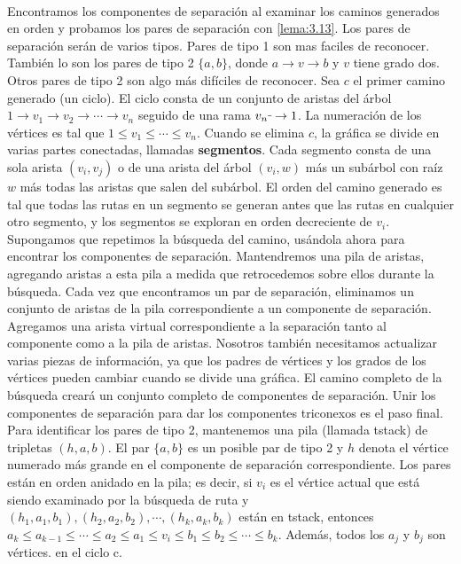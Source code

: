 \paragraph{}
Encontramos los componentes de separación al examinar los caminos generados en orden y probamos los pares de separación con \ref{lema:3.13}. Los pares de separación serán de varios tipos. Pares de tipo 1 son mas faciles de reconocer. También lo son los pares de tipo 2 $\{a, b\}$, donde $a \rightarrow v \rightarrow b$ y $v$ tiene grado dos. Otros pares de tipo 2 son algo más difíciles de reconocer. Sea $c$ el primer camino generado (un ciclo). El ciclo consta de un conjunto de aristas del árbol $1 \rightarrow v_{1} \rightarrow v_{2} \rightarrow \cdots \rightarrow v_{n}$ seguido de una rama $v_{n} \rule[1mm]{.1cm}{0.4pt} \rightarrow 1$. La numeración de los vértices es tal que $1 \le v_{1} \le \cdots \le v_{n}$. Cuando se elimina $c$, la gráfica se divide en varias partes conectadas, llamadas \textbf{segmentos}. Cada segmento consta de una sola arista $\left(v_{i}, v_{j}\right)$ o de una arista del árbol $\left(v_{i}, w\right)$ más un subárbol con raíz $w$ más todas las aristas que salen del subárbol. El orden del camino generado es tal que todas las rutas en un segmento se generan antes que las rutas en cualquier otro segmento, y los segmentos se exploran en orden decreciente de $v_{i}$.\\
Supongamos que repetimos la búsqueda del camino, usándola ahora para encontrar los componentes de separación. Mantendremos una pila de aristas, agregando aristas a esta pila a medida que retrocedemos sobre ellos durante la búsqueda. Cada vez que encontramos un par de separación, eliminamos un conjunto de aristas de la pila correspondiente a un componente de separación. Agregamos una arista virtual correspondiente a la separación tanto al componente como a la pila de aristas. Nosotros también necesitamos actualizar varias piezas de información, ya que los padres de vértices y los grados de los vértices pueden cambiar cuando se divide una gráfica. El camino completo de la búsqueda creará un conjunto completo de componentes de separación. Unir los componentes de separación para dar los componentes triconexos es el paso final.\\
Para identificar los pares de tipo 2, mantenemos una pila (llamada tstack) de tripletas $\left(h, a, b\right)$. El par $\{a, b\}$ es un posible par de tipo 2 y $h$ denota el vértice numerado más grande en el componente de separación correspondiente. Los pares están en orden anidado en la pila; es decir, si $v_{i}$ es el vértice actual que está siendo examinado por la búsqueda de ruta y $\left(h_{1}, a_{1}, b_{1}\right), \left(h_{2}, a_{2}, b_{2}\right), \cdots, \left(h_{k}, a_{k}, b_{k}\right)$ están en tstack, entonces $a_{k} \leq a_{k-1} \leq \cdots \leq a_{2} \leq a_{1} \leq v_{i} \leq b_{1} \leq b_{2} \leq \cdots \leq b_{k}$. Además, todos los $a_{j}$ y $b_{j}$ son vértices. en el ciclo c.\\

